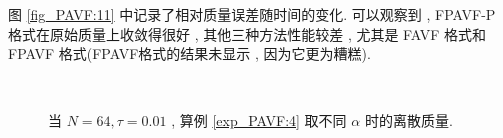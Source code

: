 	图 \ref{fig_PAVF:11} 中记录了相对质量误差随时间的变化.
	可以观察到 , FPAVF-P 格式在原始质量上收敛得很好 , 其他三种方法性能较差 , 尤其是 FAVF 格式和 FPAVF 格式(FPAVF格式的结果未显示 , 因为它更为糟糕).
\begin{figure}[H]
	\begin{center}
	 \\
	\caption{当  $N = 64 , \tau=0.01$ , 算例 \ref{exp_PAVF:4} 取不同 $\alpha$ 时的离散质量.}
	\label{fig_PAVF:9}
	\end{center}
	\end{figure}

